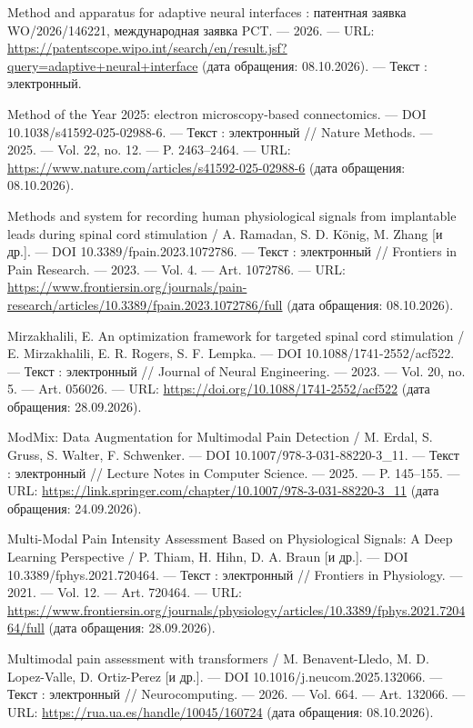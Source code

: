 \begin{list}{}{\setlength{\leftmargin}{10mm}\setlength{\labelwidth}{8mm}\setlength{\labelsep}{2mm}\setlength{\itemsep}{0pt}\setlength{\parsep}{0pt}\setlength{\topsep}{0pt}}
\item[185.] Method and apparatus for adaptive neural interfaces : патентная заявка WO/2026/146221, международная заявка PCT. — 2026. — URL: \url{https://patentscope.wipo.int/search/en/result.jsf?query=adaptive+neural+interface} (дата обращения: 08.10.2026). — Текст : электронный.
\item[186.] Method of the Year 2025: electron microscopy-based connectomics. — DOI 10.1038/s41592-025-02988-6. — Текст : электронный // Nature Methods. — 2025. — Vol. 22, no. 12. — P. 2463–2464. — URL: \url{https://www.nature.com/articles/s41592-025-02988-6} (дата обращения: 08.10.2026).
\item[187.] Methods and system for recording human physiological signals from implantable leads during spinal cord stimulation / A. Ramadan, S. D. König, M. Zhang [и др.]. — DOI 10.3389/fpain.2023.1072786. — Текст : электронный // Frontiers in Pain Research. — 2023. — Vol. 4. — Art. 1072786. — URL: \url{https://www.frontiersin.org/journals/pain-research/articles/10.3389/fpain.2023.1072786/full} (дата обращения: 08.10.2026).
\item[188.] Mirzakhalili, E. An optimization framework for targeted spinal cord stimulation / E. Mirzakhalili, E. R. Rogers, S. F. Lempka. — DOI 10.1088/1741-2552/acf522. — Текст : электронный // Journal of Neural Engineering. — 2023. — Vol. 20, no. 5. — Art. 056026. — URL: \url{https://doi.org/10.1088/1741-2552/acf522} (дата обращения: 28.09.2026).
\item[189.] ModMix: Data Augmentation for Multimodal Pain Detection / M. Erdal, S. Gruss, S. Walter, F. Schwenker. — DOI 10.1007/978-3-031-88220-3\_11. — Текст : электронный // Lecture Notes in Computer Science. — 2025. — P. 145–155. — URL: \url{https://link.springer.com/chapter/10.1007/978-3-031-88220-3\_11} (дата обращения: 24.09.2026).
\item[190.] Multi-Modal Pain Intensity Assessment Based on Physiological Signals: A Deep Learning Perspective / P. Thiam, H. Hihn, D. A. Braun [и др.]. — DOI 10.3389/fphys.2021.720464. — Текст : электронный // Frontiers in Physiology. — 2021. — Vol. 12. — Art. 720464. — URL: \url{https://www.frontiersin.org/journals/physiology/articles/10.3389/fphys.2021.720464/full} (дата обращения: 28.09.2026).
\item[191.] Multimodal pain assessment with transformers / M. Benavent-Lledo, M. D. Lopez-Valle, D. Ortiz-Perez [и др.]. — DOI 10.1016/j.neucom.2025.132066. — Текст : электронный // Neurocomputing. — 2026. — Vol. 664. — Art. 132066. — URL: \url{https://rua.ua.es/handle/10045/160724} (дата обращения: 08.10.2026).

\end{list}
